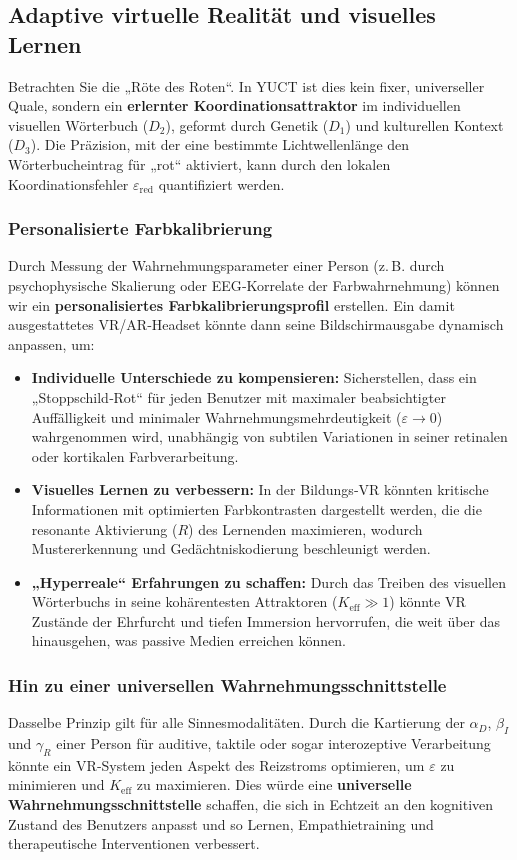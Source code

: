 \documentclass[12pt,a4paper]{article}
\begin{document}
	\subsection{Adaptive virtuelle Realität und visuelles Lernen}
	
	Betrachten Sie die „Röte des Roten“. In YUCT ist dies kein fixer, universeller Quale, sondern ein \textbf{erlernter Koordinationsattraktor} im individuellen visuellen Wörterbuch (\(D_2\)), geformt durch Genetik (\(D_1\)) und kulturellen Kontext (\(D_3\)). Die Präzision, mit der eine bestimmte Lichtwellenlänge den Wörterbucheintrag für „rot“ aktiviert, kann durch den lokalen Koordinationsfehler \(\varepsilon_{\text{red}}\) quantifiziert werden.
	
	\subsubsection{Personalisierte Farbkalibrierung}
	Durch Messung der Wahrnehmungsparameter einer Person (z. B. durch psychophysische Skalierung oder EEG‑Korrelate der Farbwahrnehmung) können wir ein \textbf{personalisiertes Farbkalibrierungsprofil} erstellen. Ein damit ausgestattetes VR/AR‑Headset könnte dann seine Bildschirmausgabe dynamisch anpassen, um:
	\begin{itemize}
		\item \textbf{Individuelle Unterschiede zu kompensieren:} Sicherstellen, dass ein „Stoppschild‑Rot“ für jeden Benutzer mit maximaler beabsichtigter Auffälligkeit und minimaler Wahrnehmungsmehrdeutigkeit (\(\varepsilon \to 0\)) wahrgenommen wird, unabhängig von subtilen Variationen in seiner retinalen oder kortikalen Farbverarbeitung.
		\item \textbf{Visuelles Lernen zu verbessern:} In der Bildungs‑VR könnten kritische Informationen mit optimierten Farbkontrasten dargestellt werden, die die resonante Aktivierung (\(R\)) des Lernenden maximieren, wodurch Mustererkennung und Gedächtniskodierung beschleunigt werden.
		\item \textbf{„Hyperreale“ Erfahrungen zu schaffen:} Durch das Treiben des visuellen Wörterbuchs in seine kohärentesten Attraktoren (\(K_{\mathrm{eff}} \gg 1\)) könnte VR Zustände der Ehrfurcht und tiefen Immersion hervorrufen, die weit über das hinausgehen, was passive Medien erreichen können.
	\end{itemize}
	
	\subsubsection{Hin zu einer universellen Wahrnehmungsschnittstelle}
	Dasselbe Prinzip gilt für alle Sinnesmodalitäten. Durch die Kartierung der \(\alpha_D\), \(\beta_I\) und \(\gamma_R\) einer Person für auditive, taktile oder sogar interozeptive Verarbeitung könnte ein VR‑System jeden Aspekt des Reizstroms optimieren, um \(\varepsilon\) zu minimieren und \(K_{\mathrm{eff}}\) zu maximieren. Dies würde eine \textbf{universelle Wahrnehmungsschnittstelle} schaffen, die sich in Echtzeit an den kognitiven Zustand des Benutzers anpasst und so Lernen, Empathietraining und therapeutische Interventionen verbessert.
	
\end{document}
